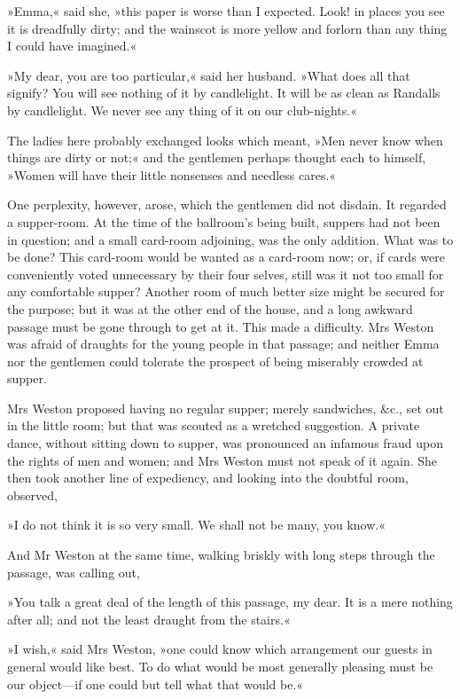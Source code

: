 »Emma,« said she, »this paper is worse than I expected. Look! in places you see it is dreadfully dirty; and the wainscot is more yellow and forlorn than any thing I could have imagined.«

»My dear, you are too particular,« said her husband. »What does all that signify? You will see nothing of it by candlelight. It will be as clean as Randalls by candlelight. We never see any thing of it on our club-nights.«

The ladies here probably exchanged looks which meant, »Men never know when things are dirty or not;« and the gentlemen perhaps thought each to himself, »Women will have their little nonsenses and needless cares.«

One perplexity, however, arose, which the gentlemen did not disdain. It regarded a supper-room. At the time of the ballroom's being built, suppers had not been in question; and a small card-room adjoining, was the only addition. What was to be done? This card-room would be wanted as a card-room now; or, if cards were conveniently voted unnecessary by their four selves, still was it not too small for any comfortable supper? Another room of much better size might be secured for the purpose; but it was at the other end of the house, and a long awkward passage must be gone through to get at it. This made a difficulty. Mrs Weston was afraid of draughts for the young people in that passage; and neither Emma nor the gentlemen could tolerate the prospect of being miserably crowded at supper.

Mrs Weston proposed having no regular supper; merely sandwiches, \&c., set out in the little room; but that was scouted as a wretched suggestion. A private dance, without sitting down to supper, was pronounced an infamous fraud upon the rights of men and women; and Mrs Weston must not speak of it again. She then took another line of expediency, and looking into the doubtful room, observed,

»I do not think it is so very small. We shall not be many, you know.«

And Mr Weston at the same time, walking briskly with long steps through the passage, was calling out,

»You talk a great deal of the length of this passage, my dear. It is a mere nothing after all; and not the least draught from the stairs.«

»I wish,« said Mrs Weston, »one could know which arrangement our guests in general would like best. To do what would be most generally pleasing must be our object—if one could but tell what that would be.«

